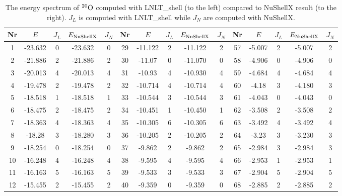 \begin{table}[h]
\caption{The energy spectrum of $^{20}\rm{O}$ computed with LNLT\_shell (to the left) compared to NuShellX result (to the right). \(J_L\) is computed with LNLT\_shell while \(J_N\) are computed with NuShellX.}
\label{tab:ox20}
\begin{tabular}{|c|c|c|c|c||c|c|c|c|c||c|c|c|c|c|}
\hline Nr & \(E\) & \(J_{L}\) & \(E_{\rm{NuShellX}}\) & \(J_{N}\) & Nr & \(E\) & \(J_{L}\) & \(E_{\rm{NuShellX}}\) & \(J_{N}\) & Nr & \(E\) & \(J_{L}\) & \(E_{\rm{NuShellX}}\) & \(J_{N}\) \\
\hline 1   & -23.632 &       0 & -23.632 & 0 & 29  & -11.122 &       2 & -11.122 & 2 & 57  &  -5.007 &       2 & -5.007 & 2 \\
\hline 2   & -21.886 &       2 & -21.886 & 2 & 30  &  -11.07 &       0 & -11.070 & 0 & 58  &  -4.906 &       0 & -4.906 & 0 \\
\hline 3   & -20.013 &       4 & -20.013 & 4 & 31  &  -10.93 &       4 & -10.930 & 4 & 59  &  -4.684 &       4 & -4.684 & 4 \\
\hline 4   & -19.478 &       2 & -19.478 & 2 & 32  & -10.714 &       4 & -10.714 & 4 & 60  &   -4.18 &       3 & -4.180 & 3 \\
\hline 5   & -18.518 &       1 & -18.518 & 1 & 33  & -10.544 &       3 & -10.544 & 3 & 61  &  -4.043 &       0 & -4.043 & 0 \\
\hline 6   & -18.475 &       2 & -18.475 & 2 & 34  & -10.451 &       1 & -10.450 & 1 & 62  &  -3.508 &       2 & -3.508 & 2 \\
\hline 7   & -18.363 &       4 & -18.363 & 4 & 35  & -10.305 &       6 & -10.305 & 6 & 63  &  -3.492 &       4 & -3.492 & 4 \\
\hline 8   &  -18.28 &       3 & -18.280 & 3 & 36  & -10.205 &       2 & -10.205 & 2 & 64  &   -3.23 &       3 & -3.230 & 3 \\
\hline 9   & -18.254 &       0 & -18.254 & 0 & 37  &  -9.862 &       2 & -9.862 & 2 & 65  &  -2.984 &       3 & -2.984 & 3 \\
\hline 10  & -16.248 &       4 & -16.248 & 4 & 38  &  -9.595 &       4 & -9.595 & 4 & 66  &  -2.953 &       1 & -2.953 & 1 \\
\hline 11  & -16.163 &       5 & -16.163 & 5 & 39  &  -9.533 &       3 & -9.533 & 3 & 67  &  -2.904 &       5 & -2.904 & 5 \\
\hline 12  & -15.455 &       2 & -15.455 & 2 & 40  &  -9.359 &       0 & -9.359 & 0 & 68  &  -2.885 &       2 & -2.885 & 2 \\

\end{tabular}
\end{table}
